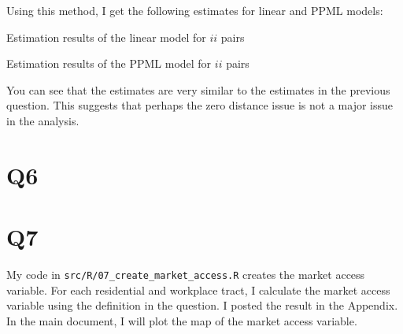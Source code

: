 \documentclass[
  11pt]{article}
\begin{document}
Using this method, I get the following estimates for linear and PPML
models:

\begin{table}[!ht]
\centering
\caption{Estimation results of the linear model for $ii$ pairs}
\label{tab:est_linear_ii_2}

\end{table}

\begin{table}[!ht]
\centering
\caption{Estimation results of the PPML model for $ii$ pairs}
\label{tab:est_ppml_ii_2}

\end{table}

You can see that the estimates are very similar to the estimates in the
previous question. This suggests that perhaps the zero distance issue is
not a major issue in the analysis.

\section*{Q6}\label{q6}

\clearpage

\section*{Q7}\label{q7}

My code in \texttt{src/R/07\_create\_market\_access.R} creates the
market access variable. For each residential and workplace tract, I
calculate the market access variable using the definition in the
question. I posted the result in the Appendix. In the main document, I
will plot the map of the market access variable.
\end{document}
